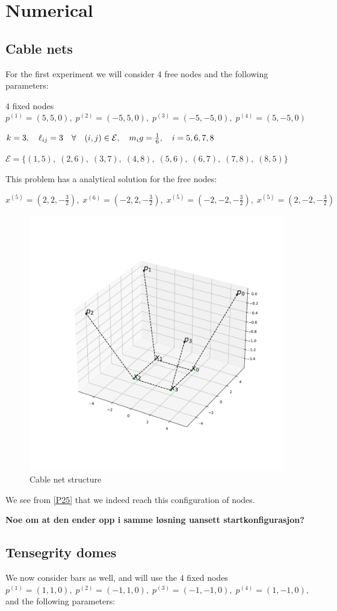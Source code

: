 \section{Numerical}

\subsection{Cable nets}
For the first experiment we will consider $4$ free nodes and the following parameters:

$4$ fixed nodes $p^{(1)} = (5,5,0),\; p^{(2)} = (-5,5,0),\; p^{(3)} = (-5,-5,0),\; p^{(4)} = (5,-5,0)$

$k=3,\quad \ell_{ij} = 3 \quad \forall \quad (i,j) \in \mathcal{E}, \quad m_i g = \frac{1}{6}, \quad i= 5,6,7,8$

$\mathcal{E} = \{(1,5),\;(2,6),\;(3,7),\;(4,8),\; (5,6),\; (6,7),\; (7,8),\; (8,5) \}$

This problem has a analytical solution for the free nodes:

$ x^{(5)} = (2,2,-\frac{3}{2}),\;x^{(6)} = (-2,2,-\frac{3}{2}),\;x^{(5)} = (-2,-2,-\frac{3}{2}),\;x^{(5)} = (2,-2,-\frac{3}{2})$

\begin{figure}
    \centering
    \includegraphics[width=0.6\columnwidth]{Bilder/P25.pdf}
    \caption{Cable net structure}
    \label{P25}
\end{figure}
We see from \eqref{P25} that we indeed reach this configuration of nodes. 

\textbf{Noe om at den ender opp i samme løsning uansett startkonfigurasjon?}

\subsection{Tensegrity domes}
We now consider bars as well, and will use the $4$ fixed nodes $p^{(1)} = (1,1,0),\; p^{(2)} = (-1,1,0),\; p^{(3)} = (-1,-1,0),\; p^{(4)} = (1,-1,0), $ and the following parameters:

